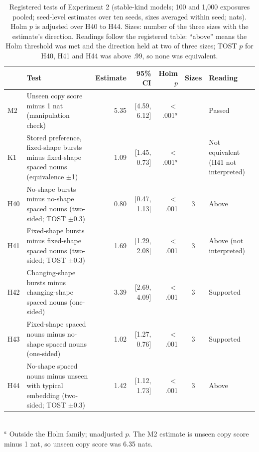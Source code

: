 \begin{table}[!htbp]
\centering\small

\begin{tabular}{@{}lp{}rrrcp{}@{}}
\toprule
& Test & Estimate & 95\% CI & Holm $p$ & Sizes & Reading \\
\midrule
M2 & Unseen copy score minus 1 nat (manipulation check) & 5.35 & [4.59, 6.12] & $<$.001$^a$ &  & Passed \\
K1 & Stored preference, fixed-shape bursts minus fixed-shape spaced nouns (equivalence $\pm$1) & \textminus{}1.09 & [\textminus{}1.45, \textminus{}0.73] & $<$.001$^a$ &  & Not equivalent (H41 not interpreted) \\
H40 & No-shape bursts minus no-shape spaced nouns (two-sided; TOST $\pm$0.3) & 0.80 & [0.47, 1.13] & $<$.001 & 3 & Above \\
H41 & Fixed-shape bursts minus fixed-shape spaced nouns (two-sided; TOST $\pm$0.3) & 1.69 & [1.29, 2.08] & $<$.001 & 3 & Above (not interpreted) \\
H42 & Changing-shape bursts minus changing-shape spaced nouns (one-sided) & 3.39 & [2.69, 4.09] & $<$.001 & 3 & Supported \\
H43 & Fixed-shape spaced nouns minus no-shape spaced nouns (one-sided) & \textminus{}1.02 & [\textminus{}1.27, \textminus{}0.76] & $<$.001 & 3 & Supported \\
H44 & No-shape spaced nouns minus unseen with typical embedding (two-sided; TOST $\pm$0.3) & 1.42 & [1.12, 1.73] & $<$.001 & 3 & Above \\
\bottomrule
\end{tabular}
\\[2pt]{\footnotesize $^a$ Outside the Holm family; unadjusted $p$. The M2 estimate is unseen copy score minus 1 nat, so unseen copy score was 6.35 nats.}
\caption{Registered tests of Experiment 2 (stable-kind models; 100 and 1,000 exposures pooled; seed-level estimates over ten seeds, sizes averaged within seed; nats). Holm $p$ is adjusted over H40 to H44. Sizes: number of the three sizes with the estimate's direction. Readings follow the registered table: ``above'' means the Holm threshold was met and the direction held at two of three sizes; TOST $p$ for H40, H41 and H44 was above .99, so none was equivalent.}
\label{tab:N1}
\end{table}

